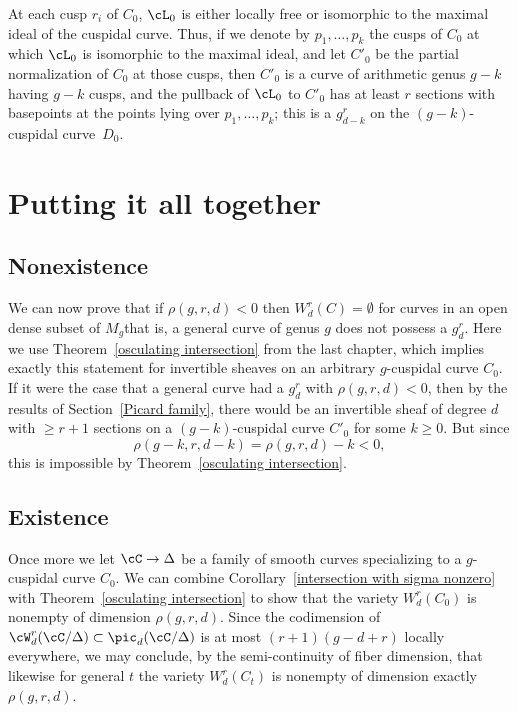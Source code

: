 At each cusp $r_i$ of $C_0$, $\cL_0$ is either locally free or
isomorphic to the maximal ideal of the cuspidal curve. Thus, if we
denote by $p_1,\dots, p_k$ the cusps of $C_0$ at which $\cL_0$ is
isomorphic to the maximal ideal, and let $C'_{0}$ be the partial
normalization of $C_0$ at those cusps, then $C'_{0}$ is a curve of
arithmetic genus $g-k$ having $g-k$ cusps, and the pullback of $\cL_0$
to $C'_{0}$ has at least $r$ sections with basepoints at the points
lying over $p_1,\dots,p_k$;  this is a $g^r_{d-k}$ on the
$(g-k)$-cuspidal curve~$D_0$.

\section{Putting it all together}
\label{nonexistence}

\subsection*{Nonexistence}

We can now prove that if $\rho(g,r,d) < 0$  then $W^{r}_{d}(C) =
\emptyset$ for curves in an open dense subset of $M_{g}$\emdash that is,
a general curve of genus $g$ does not possess a $g^r_d$.
Here we use Theorem~\ref{osculating intersection} from the last chapter,
which implies exactly this statement for invertible sheaves on an
arbitrary $g$-cuspidal curve $C_0$. If it were the case that a general
curve
had
a $g^r_d$ with $\rho(g,r,d) < 0$, then by the results
of Section~\ref{Picard family}, there would be
 an invertible sheaf of degree $d$ with $\geq r+1$ sections on a
 $(g-k)$-cuspidal curve  $ C'_0$ for some $k \geq 0$. But since
$$
\rho(g-k, r, d-k) = \rho(g,r,d) - k < 0
,
$$
this is impossible by Theorem~\ref{osculating intersection}.

\subsection*{Existence}

Once more we let $\cC \to \Delta$ be a family of smooth
curves specializing to a $g$-cuspidal curve $C_0$. We can
combine
Corollary~\ref{intersection with sigma nonzero} with
Theorem~\ref{osculating intersection} to
show
that the variety $W^r_d(C_0)$
is nonempty of dimension $\rho(g,r,d)$. Since the codimension of
$\cW^r_d(\cC/\Delta) \subset \pic_d(\cC/\Delta)$ is at most $(r+1)(g-d+r)$
locally everywhere, we may conclude, by the semi-continuity of fiber dimension, that likewise for general $t$
the variety $W^r_d(C_t)$ is nonempty of dimension exactly $\rho(g,r,d)$.

